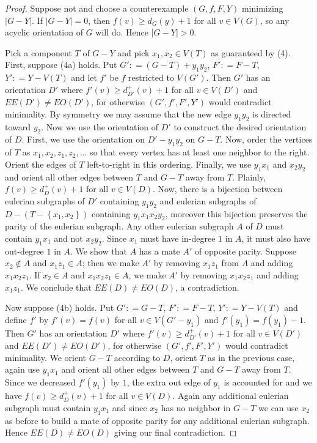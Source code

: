 \documentclass[12pt]{article}
\theoremstyle{plain}
\theoremstyle{definition}
\theoremstyle{remark}
\newcommand{\set}[1]{\left\{ #1 \right\}}
\newcommand{\card}[1]{\left|#1\right|}
\newcommand{\parens}[1]{\left( #1 \right)}
\newcommand{\DefinedAs}{\mathrel{\mathop:}=}
\begin{document}
\begin{proof}
Suppose not and choose a counterexample $\parens{G, f, F, Y}$ minimizing $\card{G-Y}$.  If $\card{G-Y} = 0$, then $f(v) \geq d_G(y) + 1$ for all $v \in V(G)$, so any acyclic orientation of $G$ will do. Hence $\card{G-Y} > 0$.  

Pick a component $T$ of $G - Y$ and pick $x_1, x_2 \in V(T)$ as guaranteed by (4). First, suppose (4a) holds.   Put $G' \DefinedAs (G - T) + y_1y_2$, $F' \DefinedAs F - T$, $Y' \DefinedAs Y - V(T)$ and let $f'$ be $f$ restricted to $V(G')$.  Then $G'$ has an orientation $D'$ where $f'(v) \geq d_{D'}^+(v) + 1$ for all $v \in V(D')$ and $EE(D') \neq EO(D')$, for otherwise $\parens{G', f', F', Y'}$ would contradict minimality.  By symmetry we may assume that the new edge $y_1y_2$ is directed toward $y_2$.  Now we use the orientation of $D'$ to construct the desired orientation of $D$. First, we use the orientation on $D' - y_1y_2$ on $G-T$. Now, order the vertices of $T$ as $x_1, x_2, z_1, z_2, \ldots$ so that every vertex has at least one neighbor to the right.  Orient the edges of $T$ left-to-right in this ordering.  Finally, we use $y_1x_1$ and $x_2y_2$ and orient all other edges between $T$ and $G-T$ away from $T$.  Plainly, $f(v) \geq d_{D}^+(v) + 1$ for all $v \in V(D)$.  Now, there is a bijection between eulerian subgraphs of $D'$ containing $y_1y_2$ and eulerian subgraphs of $D - (T - \set{x_1, x_2})$ containing $y_1x_1x_2y_2$, moreover this bijection preserves the parity of the eulerian subgraph.  Any other eulerian subgraph $A$ of $D$ must contain $y_1x_1$ and not $x_2y_2$.  Since $x_1$ must have in-degree $1$ in $A$, it must also have out-degree $1$ in $A$.  We show that $A$ has a mate $A'$ of opposite parity.  Suppose $x_2 \not \in A$ and $x_1z_1 \in A$; then we make $A'$ by removing $x_1z_1$ from $A$ and adding $x_1x_2z_1$.  If $x_2 \in A$ and $x_1x_2z_1 \in A$, we make $A'$ by removing $x_1x_2z_1$ and adding $x_1z_1$.  We conclude that $EE(D) \neq EO(D)$, a contradiction.

Now suppose (4b) holds.  Put $G' \DefinedAs G - T$, $F' \DefinedAs F - T$, $Y' \DefinedAs Y - V(T)$ and define $f'$ by $f'(v) = f(v)$ for all $v \in V(G'-y_1)$ and $f'(y_1) = f(y_1) - 1$.  Then $G'$ has an orientation $D'$ where $f'(v) \geq d_{D'}^+(v) + 1$ for all $v \in V(D')$ and $EE(D') \neq EO(D')$, for otherwise $\parens{G', f', F', Y'}$ would contradict minimality.  We orient $G - T$ according to $D$, orient $T$ as in the previous case, again use $y_1x_1$ and orient all other edges between $T$ and $G-T$ away from $T$.  Since we decreased $f'(y_1)$ by $1$, the extra out edge of $y_1$ is accounted for and we have $f(v) \geq d_{D}^+(v) + 1$ for all $v \in V(D)$.  Again any additional eulerian subgraph must contain $y_1x_1$ and since $x_2$ has no neighbor in $G-T$ we can use $x_2$ as before to build a mate of opposite parity for any additional eulerian subgraph.  Hence $EE(D) \neq EO(D)$ giving our final contradiction.
\end{proof}
\end{document}
